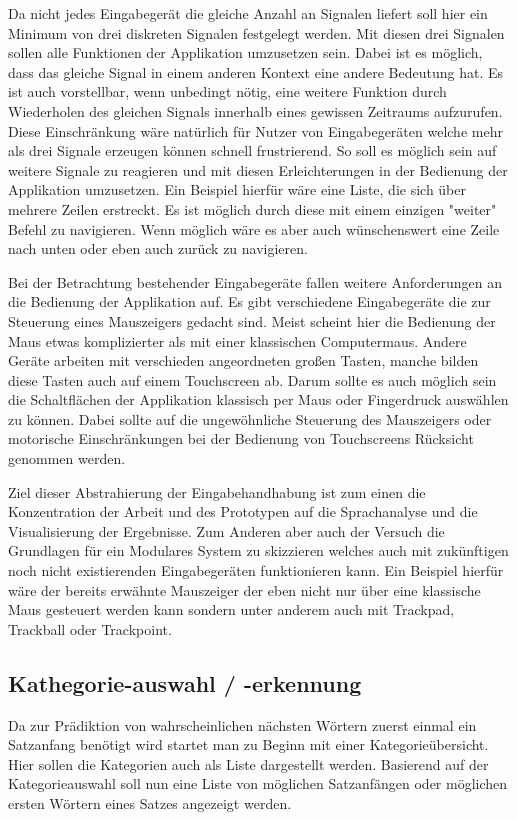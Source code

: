         Da nicht jedes Eingabegerät die gleiche Anzahl an Signalen liefert soll hier ein Minimum von drei diskreten Signalen festgelegt werden. Mit diesen drei Signalen sollen alle Funktionen der Applikation umzusetzen sein. Dabei ist es möglich, dass das gleiche Signal in einem anderen Kontext eine andere Bedeutung hat. Es ist auch vorstellbar, wenn unbedingt nötig, eine weitere Funktion durch Wiederholen des gleichen Signals innerhalb eines gewissen Zeitraums aufzurufen. Diese Einschränkung wäre natürlich für Nutzer von Eingabegeräten welche mehr als drei Signale erzeugen können schnell frustrierend. So soll es möglich sein auf weitere Signale zu reagieren und mit diesen Erleichterungen in der Bedienung der Applikation umzusetzen. Ein Beispiel hierfür wäre eine Liste, die sich über mehrere Zeilen erstreckt. Es ist möglich durch diese mit einem einzigen "weiter" Befehl zu navigieren. Wenn möglich wäre es aber auch wünschenswert eine Zeile nach unten oder eben auch zurück zu navigieren.
        
        Bei der Betrachtung bestehender Eingabegeräte fallen weitere Anforderungen an die Bedienung der Applikation auf. Es gibt verschiedene Eingabegeräte die zur Steuerung eines Mauszeigers gedacht sind. Meist scheint hier die Bedienung der Maus etwas komplizierter als mit einer klassischen Computermaus. Andere Geräte arbeiten mit verschieden angeordneten großen Tasten, manche bilden diese Tasten auch auf einem Touchscreen ab. Darum sollte es auch möglich sein die Schaltflächen der Applikation klassisch per Maus oder Fingerdruck auswählen zu können. Dabei sollte auf die ungewöhnliche Steuerung des Mauszeigers oder motorische Einschränkungen bei der Bedienung von Touchscreens Rücksicht genommen werden.
        
        Ziel dieser Abstrahierung der Eingabehandhabung ist zum einen die Konzentration der Arbeit und des Prototypen auf die Sprachanalyse und die Visualisierung der Ergebnisse. Zum Anderen aber auch der Versuch die Grundlagen für ein Modulares System zu skizzieren welches auch mit zukünftigen noch nicht existierenden Eingabegeräten funktionieren kann. Ein Beispiel hierfür wäre der bereits erwähnte Mauszeiger der eben nicht nur über eine klassische Maus gesteuert werden kann sondern unter anderem auch mit Trackpad, Trackball oder Trackpoint.
        \newpage
        
        
        
	\subsection{Kathegorie-auswahl / -erkennung}
    	Da zur Prädiktion von wahrscheinlichen nächsten Wörtern zuerst einmal ein Satzanfang benötigt wird startet man zu Beginn mit einer Kategorieübersicht. Hier sollen die Kategorien auch als Liste dargestellt werden. Basierend auf der Kategorieauswahl soll nun eine Liste von möglichen Satzanfängen oder möglichen ersten Wörtern eines Satzes angezeigt werden. 
        
